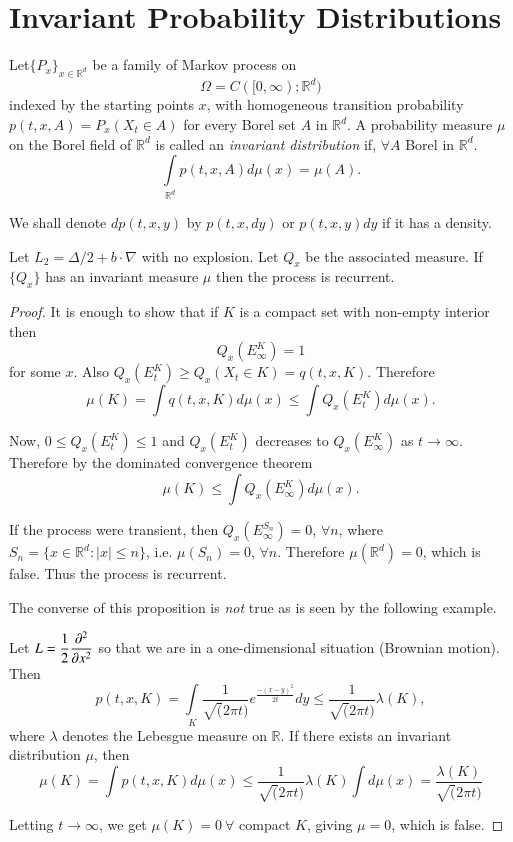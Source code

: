 \chapter{Invariant Probability Distributions}\label{chap31}

\begin{defi*}
Let\pageoriginale $\{P_{x}\}_{x\in \mathbb{R}^{d}}$ be a family of
Markov process on 
$$
\Omega=C([0,\infty);\mathbb{R}^{d})
$$ 
indexed by the
  starting points $x$, with homogeneous transition probability
  $p(t,x,A)=P_{x}(X_{t}\in A)$ for every Borel set $A$ in
  $\mathbb{R}^{d}$. A probability measure $\mu$ on the Borel field of
  $\mathbb{R}^{d}$ is called an {\em invariant distribution} if,
  $\forall A$ Borel in $\mathbb{R}^{d}$.
$$
\int\limits_{\mathbb{R}^{d}}p(t,x,A)d\mu(x)=\mu(A).
$$

We shall denote $dp(t,x,y)$ by $p(t,x,dy)$ or $p(t,x,y)dy$ if it has a
density. 
\end{defi*}

\begin{prop*}
Let $L_{2}=\Delta/2+b\cdot\nabla$ with no explosion. Let $Q_{x}$ be
the associated measure. If $\{Q_{x}\}$ has an invariant measure $\mu$
then the process is recurrent.
\end{prop*}

\begin{proof}
It is enough to show that if $K$ is a compact set with non-empty
interior then
$$
Q_{x}(E^{K}_{\infty})=1
$$
for some $x$. Also $Q_{x}(E^{K}_{t})\geq Q_{x}(X_{t}\in
K)=q(t,x,K)$. Therefore
$$
\mu(K)=\int q(t,x,K)d\mu(x)\leq \int Q_{x}(E^{K}_{t})d\mu(x).
$$

Now, $0\leq Q_{x}(E^{K}_{t})\leq 1$ and $Q_{x}(E^{K}_{t})$ decreases
to $Q_{x}(E^{K}_{\infty})$ as $t\to \infty$. Therefore by the
dominated convergence theorem
$$
\mu(K)\leq \int Q_{x}(E^{K}_{\infty})d\mu(x).
$$\pageoriginale

If the process were transient, then $Q_{x}(E^{S_{n}}_{\infty})=0$,
$\forall n$, where $S_{n}=\{x\in \mathbb{R}^{d}:|x|\leq n\}$, i.e.\@
$\mu(S_{n})=0$, $\forall n$. Therefore $\mu(\mathbb{R}^{d})=0$, which
is false. Thus the process is recurrent.

The converse of this proposition is {\em not} true as is seen by the
following example.

Let $L=\dfrac{1}{2}\dfrac{\partial^{2}}{\partial x^{2}}$ so that we are in a
one-dimensional situation (Brownian motion). Then
$$
p(t,x,K)=\int\limits_{K}\frac{1}{\surd (2\pi
  t)}e^{\frac{-(x-y)^{2}}{2t}}dy\leq \frac{1}{\surd (2\pi t)}\lambda (K),
$$
where $\lambda$ denotes the Lebesgue measure on $\mathbb{R}$. If there
exists an invariant distribution $\mu$, then
$$
\mu(K)=\int p(t,x,K)d\mu(x)\leq \frac{1}{\surd(2\pi t)}\lambda(K)\int
d\mu(x)=\frac{\lambda(K)}{\surd (2\pi t)}
$$

Letting $t\to \infty$, we get $\mu(K)=0\ \forall$ compact $K$, giving
$\mu=0$, which is false.
\end{proof}

